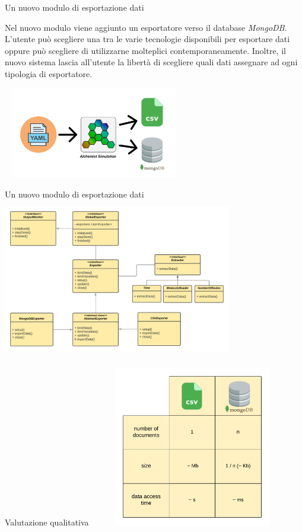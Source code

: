 \documentclass{beamer}
\begin{document}
\begin{frame}{Un nuovo modulo di esportazione dati}
\begin{block}{}
Nel nuovo modulo viene aggiunto un esportatore verso il database \textit{MongoDB}. L’utente può scegliere una tra le varie tecnologie disponibili per esportare dati oppure può scegliere di utilizzarne molteplici contemporaneamente. Inoltre, il nuovo sistema lascia all’utente la libertà di scegliere quali dati assegnare ad ogni tipologia di esportatore.
\end{block}
\hfil\hfil\includegraphics[width=8cm, height=4cm]{images/csv-mongo-export.png}
\end{frame}

\begin{frame}{Un nuovo modulo di esportazione dati}
\hfil\hfil\includegraphics[width=10cm, height=7cm]{images/new_architechture.png}
\end{frame}

\begin{frame}{Valutazione qualitativa}
\hfil\hfil\includegraphics[width=9cm, height=7cm]{images/val_qual.png}
\end{frame}
\end{document}

